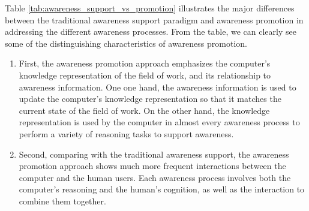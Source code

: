 Table \ref{tab:awareness_support_vs_promotion} illustrates the major differences between the traditional awareness support paradigm and awareness promotion in addressing the different awareness processes. From the table, we can clearly see some of the distinguishing characteristics of awareness promotion. 

\begin{enumerate}
   \item First, the awareness promotion approach emphasizes the computer's knowledge representation of the field of work, and its relationship to awareness information. One one hand, the awareness information is used to update the computer's knowledge representation so that it matches the current state of the field of work. On the other hand, the knowledge representation is used by the computer in almost every awareness process to perform a variety of reasoning tasks to support awareness.
   \item Second, comparing with the traditional awareness support, the awareness promotion approach shows much more frequent interactions between the computer and the human users. Each awareness process involves both the computer's reasoning and the human's cognition, as well as the interaction to combine them together. 
\end{enumerate} 

